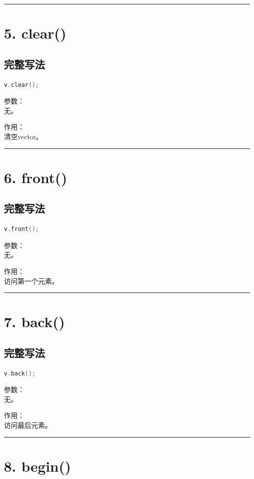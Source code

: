 \documentclass[10pt,twocolumn]{extarticle}
\begin{document}
\noindent\rule{\linewidth}{0.4pt}

\section{5. clear()}

\subsection{完整写法}
\begin{lstlisting}[language=C++]
v.clear();
\end{lstlisting}
参数：\\
无。

作用：\\
清空vector。

\noindent\rule{\linewidth}{0.4pt}

\section{6. front()}

\subsection{完整写法}
\begin{lstlisting}[language=C++]
v.front();
\end{lstlisting}
参数：\\
无。

作用：\\
访问第一个元素。

\noindent\rule{\linewidth}{0.4pt}

\section{7. back()}

\subsection{完整写法}
\begin{lstlisting}[language=C++]
v.back();
\end{lstlisting}
参数：\\
无。

作用：\\
访问最后元素。

\noindent\rule{\linewidth}{0.4pt}

\section{8. begin()}
\end{document}
